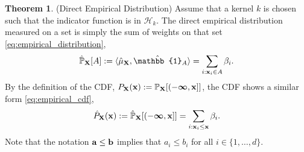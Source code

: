 \documentclass[twoside]{article} \usepackage{aistats2017}
\theoremstyle{definition}
\theoremstyle{theorem}
\newtheorem{theorem}{Theorem}[section]
\newcommand{\rv}[1]{{#1}}
\newcommand{\inner}[2]{{\langle #1, #2 \rangle}}
\begin{document}
		\begin{theorem} \label{thm:empirical_distribution_and_cdf}
			(Direct Empirical Distribution)
			Assume that a kernel $k$ is chosen such that the indicator function is in $\mathcal{H}_{k}$. The direct empirical distribution measured on a set is simply the sum of weights on that set \eqref{eq:empirical_distribution},
			\begin{equation}
				\hat{\mathbb{P}}_{\bvec{\rv{X}}}[A] := \inner{\hat{\mu}_{\bvec{\rv{X}}}}{ \hat{\mathbb{1}}_{A}} = \sum_{i : \bvec{x}_{i} \in A} \beta_{i}.
			\label{eq:empirical_distribution}
			\end{equation}
			By the definition of the CDF, $P_{\bvec{\rv{X}}}(\bvec{x}) := \mathbb{P}_{\bvec{\rv{X}}}[(-\bm{\infty}, \bvec{x}]]$, the CDF shows a similar form \eqref{eq:empirical_cdf},
			\begin{equation}
				\hat{P}_{\bvec{\rv{X}}}(\bvec{x}) := \hat{\mathbb{P}}_{\bvec{\rv{X}}}[(-\bm{\infty}, \bvec{x}]] = \sum_{i : \bvec{x}_{i} \leq \bvec{x}} \beta_{i}.
			\label{eq:empirical_cdf}
			\end{equation}
			Note that the notation $\mathbf{a} \leq \mathbf{b}$ implies that $a_{i} \leq b_{i}$ for all $i \in \{1, \dots, d\}$.
		\end{theorem}
			
\end{document}
